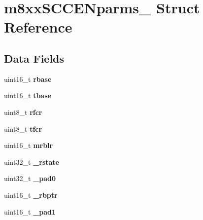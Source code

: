 \hypertarget{structm8xxSCCENparms__}{}\section{m8xx\+S\+C\+C\+E\+Nparms\+\_\+ Struct Reference}
\label{structm8xxSCCENparms__}
\subsection*{Data Fields}
\begin{DoxyCompactItemize}
\item 
\mbox{\label{structm8xxSCCENparms___a3146be46c2bf9aa4d2ce68bacf0a8c02}} 
uint16\+\_\+t {\bfseries rbase}
\item 
\mbox{\label{structm8xxSCCENparms___a889a2b5250ffd8fb2679f0c1a1cbc175}} 
uint16\+\_\+t {\bfseries tbase}
\item 
\mbox{\label{structm8xxSCCENparms___a6eb7219bcac0f29044f6b7b0180589ef}} 
uint8\+\_\+t {\bfseries rfcr}
\item 
\mbox{\label{structm8xxSCCENparms___a7256a008fd7174efda2e6d14b8cfb63f}} 
uint8\+\_\+t {\bfseries tfcr}
\item 
\mbox{\label{structm8xxSCCENparms___af66f485529cd22451292126f0108c296}} 
uint16\+\_\+t {\bfseries mrblr}
\item 
\mbox{\label{structm8xxSCCENparms___a541ed3eca9c5af7d019aab2dfae04ad0}} 
uint32\+\_\+t {\bfseries \+\_\+rstate}
\item 
\mbox{\label{structm8xxSCCENparms___a40c821ae5172b3bc3398887f75dadc57}} 
uint32\+\_\+t {\bfseries \+\_\+pad0}
\item 
\mbox{\label{structm8xxSCCENparms___a50ae6115a6765d7483d914491a936021}} 
uint16\+\_\+t {\bfseries \+\_\+rbptr}
\item 
\mbox{\label{structm8xxSCCENparms___aa5939fc2ec2b004109f1e6391e78984b}} 
uint16\+\_\+t {\bfseries \+\_\+pad1}

\end{DoxyCompactItemize}
